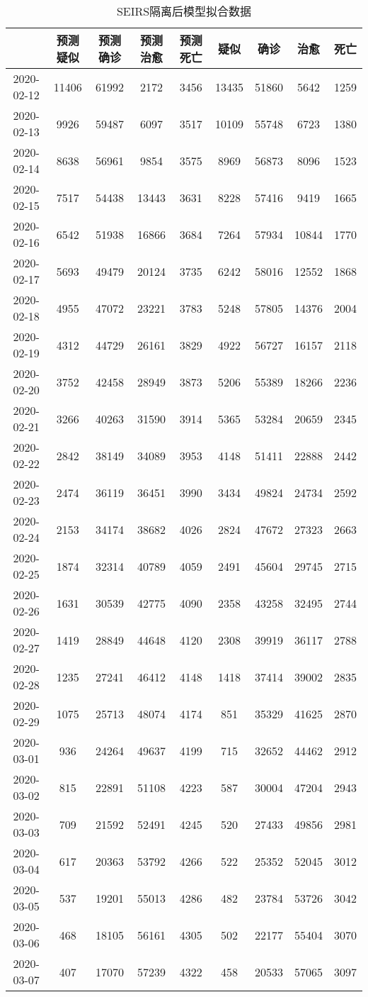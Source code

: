 \begin{longtable}{ccccccccc}
\caption{SEIRS隔离后模型拟合数据}\\
\hline
&预测疑似&预测确诊&预测治愈&预测死亡&疑似&确诊&治愈&死亡\\
\hline
2020-02-12&11406&61992&2172&3456&13435&51860&5642&1259\\
2020-02-13&9926&59487&6097&3517&10109&55748&6723&1380\\
2020-02-14&8638&56961&9854&3575&8969&56873&8096&1523\\
2020-02-15&7517&54438&13443&3631&8228&57416&9419&1665\\
2020-02-16&6542&51938&16866&3684&7264&57934&10844&1770\\
2020-02-17&5693&49479&20124&3735&6242&58016&12552&1868\\
2020-02-18&4955&47072&23221&3783&5248&57805&14376&2004\\
2020-02-19&4312&44729&26161&3829&4922&56727&16157&2118\\
2020-02-20&3752&42458&28949&3873&5206&55389&18266&2236\\
2020-02-21&3266&40263&31590&3914&5365&53284&20659&2345\\
2020-02-22&2842&38149&34089&3953&4148&51411&22888&2442\\
2020-02-23&2474&36119&36451&3990&3434&49824&24734&2592\\
2020-02-24&2153&34174&38682&4026&2824&47672&27323&2663\\
2020-02-25&1874&32314&40789&4059&2491&45604&29745&2715\\
2020-02-26&1631&30539&42775&4090&2358&43258&32495&2744\\
2020-02-27&1419&28849&44648&4120&2308&39919&36117&2788\\
2020-02-28&1235&27241&46412&4148&1418&37414&39002&2835\\
2020-02-29&1075&25713&48074&4174&851&35329&41625&2870\\
2020-03-01&936&24264&49637&4199&715&32652&44462&2912\\
2020-03-02&815&22891&51108&4223&587&30004&47204&2943\\
2020-03-03&709&21592&52491&4245&520&27433&49856&2981\\
2020-03-04&617&20363&53792&4266&522&25352&52045&3012\\
2020-03-05&537&19201&55013&4286&482&23784&53726&3042\\
2020-03-06&468&18105&56161&4305&502&22177&55404&3070\\
2020-03-07&407&17070&57239&4322&458&20533&57065&3097\\

\end{longtable}
